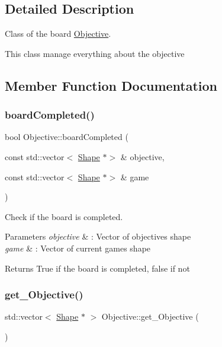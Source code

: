 \subsection{Detailed Description}
Class of the board \hyperlink{classObjective}{Objective}. 

This class manage everything about the objective 

\subsection{Member Function Documentation}
\mbox{\label{classObjective_ac7ad4e014ef1d141ab2102958d5ea2f6}} 
\subsubsection{\texorpdfstring{board\+Completed()}{boardCompleted()}}
{\footnotesize\ttfamily bool Objective\+::board\+Completed (\begin{DoxyParamCaption}\item[{const std\+::vector$<$ \hyperlink{classShape}{Shape} $\ast$$>$ \&}]{objective,  }\item[{const std\+::vector$<$ \hyperlink{classShape}{Shape} $\ast$$>$ \&}]{game }\end{DoxyParamCaption})\hspace{0.3cm}{\ttfamily [static]}}



Check if the board is completed. 


\begin{DoxyParams}{Parameters}
{\em objective} & \+: Vector of objective\textquotesingle{}s shape \\
\hline
{\em game} & \+: Vector of current game\textquotesingle{}s shape \\
\hline
\end{DoxyParams}
\begin{DoxyReturn}{Returns}
True if the board is completed, false if not 
\end{DoxyReturn}
\mbox{\label{classObjective_af8549ee8afd9571567a12dc4ecfddbcc}} 
\subsubsection{\texorpdfstring{get\+\_\+\+Objective()}{get\_Objective()}}
{\footnotesize\ttfamily std\+::vector$<$ \hyperlink{classShape}{Shape} $\ast$ $>$ Objective\+::get\+\_\+\+Objective (\begin{DoxyParamCaption}{ }\end{DoxyParamCaption})}



